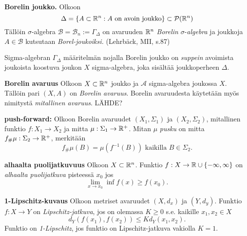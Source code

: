 \begin{definition}
    \textbf{Borelin joukko. }
    Olkoon
    \[\Delta = \{A \subset \mathbb{R}^n : A \text{ on avoin joukko}\} \subset \mathcal{P}(\mathbb{R}^n) \]
    Tällöin $\sigma$-algebra $\mathcal B = \mathcal B_n := \Gamma_\Delta$ on avaruuden $\mathbb{R}^n$ \textit{Borelin} $\sigma$-\textit{algebra} ja joukkoja $A\in \mathcal B$ kutsutaan \textit{Borel-joukoiksi.} 
    (Lehrbäck, MII, s.87)
\end{definition}

Sigma-algebran $\Gamma_\Delta$ määritelmän nojalla Borelin joukko on \textit{suppein} avoimista joukoista koostuva joukon $X$ sigma-algebra, joka sisältää joukkoperheen $\Delta$.



\begin{definition}
    \textbf{Borelin avaruus } Olkoon $X\subset \mathbb{R}^n$ joukko ja $\mathcal A$ sigma-algebra joukossa $X$. Tällöin pari $(X, A)$ on \textit{Borelin avaruus}. Borelin avaruudesta käytetään myös nimitystä \textit{mitallinen avaruus}. LÄHDE?
\end{definition}

\begin{definition}
    \textbf{push-forward:} Olkoon Borelin avaruudet $(X_1, \Sigma_1)$ ja $(X_2, \Sigma_2)$, mitallinen funktio $f:X_1 \to X_2$ ja mitta $\mu: \Sigma_1 \to \mathbb{R}^+$. Mitan $\mu$ \textit{pusku} on mitta $f_\#\mu: \Sigma_2 \to \mathbb{R}^+$, merkitään
    $$f_\# \mu (B) = \mu(f^{-1}(B)) \text{ kaikilla } B\in \Sigma_2.$$
\end{definition}

\begin{definition}
    \textbf{alhaalta puolijatkuvuus} Olkoon $X\subset \mathbb{R}^n$. Funktio $f: X \to \mathbb{R} \cup\{-\infty, \infty\}$ on \textit{alhaalta puolijatkuva} pisteessä $x_0$ jos 
    $$\lim_{x\to x_0} \inf f(x) \ge f(x_0).$$
\end{definition}

\begin{definition}
    \textbf{1-Lipschitz-kuvaus} Olkoon metriset avaruudet $(X, d_x)$ ja $(Y, d_y)$. Funktio $f:X\to Y$ on \textit{Lipschitz-jatkuva}, jos on olemassa $K\ge 0$ s.e. kaikille $x_1,x_2 \in X$
    $$d_Y(f(x_1),f(x_2)) \le Kd_Y(x_1,x_2).$$
    Funktio on \textit{1-Lipschitz}, jos funktio on Lipschitz-jatkuva vakiolla $K=1$.
\end{definition}

